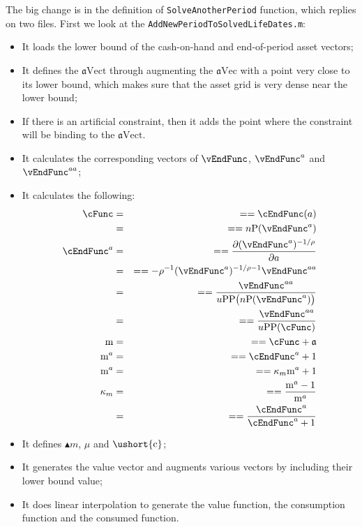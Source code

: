 \documentclass[titlepage,abstract]{\econtex}
\providecommand{\mFunc}{\ensuremath{\mathrm{m}}}
\providecommand{\aEndFunc}{\ensuremath{\mathfrak{a}}}
\begin{document}
The big change is in the definition of \texttt{SolveAnotherPeriod} function, which replies on two files. First we look at the \texttt{AddNewPeriodToSolvedLifeDates.m}:
      \begin{itemize}
        \item It loads the lower bound of the cash-on-hand and end-of-period asset vectors;
        \item It defines the $\ensuremath{\mathfrak{a}}\text{Vect}$ through augmenting the $\ensuremath{\mathfrak{a}}\text{Vec}$ with a point very close to its lower bound, which makes sure that the asset grid is very dense near the lower bound;
        \item If there is an artificial constraint, then it adds the point where the constraint will be binding to the $\ensuremath{\mathfrak{a}}\text{Vect}$.
        \item It calculates the corresponding vectors of $\vEndFunc$, $\vEndFunc^{a}$ and $\vEndFunc^{aa}$;
        \item It calculates the following:
        \begin{equation}\begin{gathered}\begin{aligned}
        \cFunc   &=& =  =  \cEndFunc(a) \\
          &=& =  =  n\text{P}(\vEndFunc^{a}) \\
        \cEndFunc^{a}   &=& =  = \frac{\partial (\vEndFunc^{a})^{-1/\rho}}{\partial a} \\
          &=& =  =  -\rho^{-1} (\vEndFunc^{a})^{-1/\rho-1} \vEndFunc^{aa} \\
          &=& =  =  \frac{\vEndFunc^{aa} }{u\text{PP}\big(
        n\text{P}(\vEndFunc^{a})\big)} \\
          &=& =  =  \frac{\vEndFunc^{aa} }{u\text{PP}(\cFunc)} \\
        \mFunc   &=& =  =  \cFunc + \aEndFunc \\
        \mFunc^{a}   &=& =  =  \cEndFunc^{a} + 1 \\
        \mFunc^{a}   &=& =  =  \kappa_{m}\mFunc^{a} + 1 \\
        \kappa_{m}   &=& =  =  \frac{\mFunc^{a}-1}{\mFunc^{a}} \\
          &=& =  =  \frac{\cEndFunc^{a}}{\cEndFunc^{a}+1}
        \end{aligned}\end{gathered}\end{equation}
        \item It defines $\ensuremath{\blacktriangle {m}}$, $\mu$ and $\ensuremath{\ushort{\mathrm{c}}}$;
        \item It generates the value vector and augments various vectors by including their lower bound value;
        \item It does linear interpolation to generate the value function, the consumption function and the consumed function.
        \end{itemize}
\end{document}
